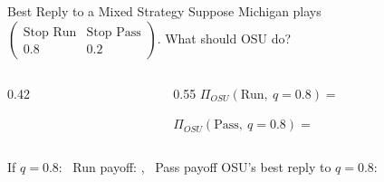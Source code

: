 

\begin{frame}{Best Reply to a Mixed Strategy}
Suppose Michigan plays $\begin{pmatrix} \text{Stop Run} & \text{Stop Pass} \\ 0.8 & 0.2\end{pmatrix}$. What should OSU do?
\bsk
\begin{columns}[T]
\begin{column}{0.42\textwidth}
\centering
\begin{matrixgame}[top={Stop Run, Stop Pass}, left={Run, Pass}, player names={Ohio State, Michigan}, w=1.9]
\end{matrixgame}
\end{column}
\begin{column}{0.55\textwidth}
$\Pi_{OSU}(\text{Run},\ q=0.8)=$
\vspace{0.45in}

$\Pi_{OSU}(\text{Pass},\ q=0.8)=$
\end{column}
\end{columns}
\bsk
If $q=0.8$: \ Run payoff: \underline{\hspace{0.6in}}, \ Pass payoff \underline{\hspace{0.6in}}
\bsk
OSU's best reply to $q=0.8$: \underline{\hspace{1.2in}}
\vfill
\vspace{-0.2in}
\end{frame}


